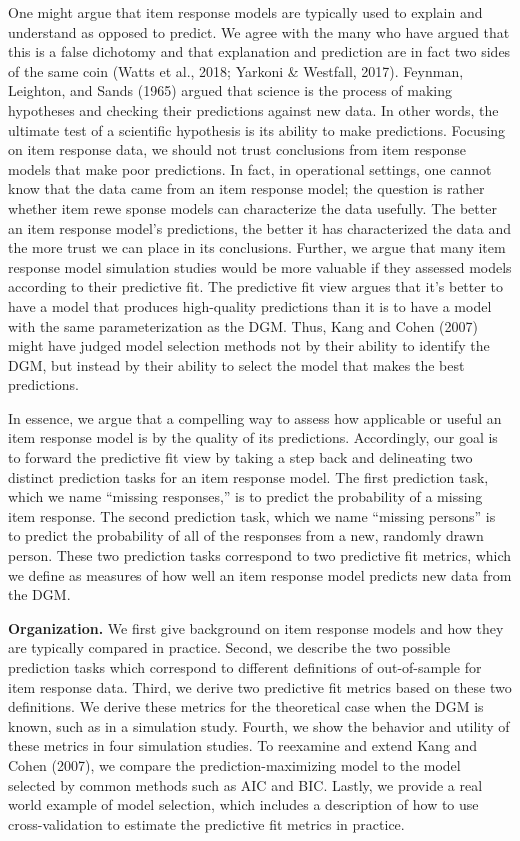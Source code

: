 \documentclass[
  english,
  man,floatsintext]{apa7}
\begin{document}
One might argue that item response models are typically used to explain and understand as opposed to predict. We agree with the many who have argued that this is a false dichotomy and that explanation and prediction are in fact two sides of the same coin (Watts et al., 2018; Yarkoni \& Westfall, 2017). Feynman, Leighton, and Sands (1965) argued that science is the process of making hypotheses and checking their predictions against new data. In other words, the ultimate test of a scientific hypothesis is its ability to make predictions. Focusing on item response data, we should not trust conclusions from item response models that make poor predictions. In fact, in operational settings, one cannot know that the data came from an item response model; the question is rather whether item rewe sponse models can characterize the data usefully. The better an item response model's predictions, the better it has characterized the data and the more trust we can place in its conclusions. Further, we argue that many item response model simulation studies would be more valuable if they assessed models according to their predictive fit. The predictive fit view argues that it's better to have a model that produces high-quality predictions than it is to have a model with the same parameterization as the DGM. Thus, Kang and Cohen (2007) might have judged model selection methods not by their ability to identify the DGM, but instead by their ability to select the model that makes the best predictions.

In essence, we argue that a compelling way to assess how applicable or useful an item response model is by the quality of its predictions. Accordingly, our goal is to forward the predictive fit view by taking a step back and delineating two distinct prediction tasks for an item response model. The first prediction task, which we name ``missing responses,'' is to predict the probability of a missing item response. The second prediction task, which we name ``missing persons'' is to predict the probability of all of the responses from a new, randomly drawn person. These two prediction tasks correspond to two predictive fit metrics, which we define as measures of how well an item response model predicts new data from the DGM.

\textbf{Organization.} We first give background on item response models and how they are typically compared in practice. Second, we describe the two possible prediction tasks which correspond to different definitions of out-of-sample for item response data. Third, we derive two predictive fit metrics based on these two definitions. We derive these metrics for the theoretical case when the DGM is known, such as in a simulation study. Fourth, we show the behavior and utility of these metrics in four simulation studies. To reexamine and extend Kang and Cohen (2007), we compare the prediction-maximizing model to the model selected by common methods such as AIC and BIC. Lastly, we provide a real world example of model selection, which includes a description of how to use cross-validation to estimate the predictive fit metrics in practice.
\end{document}
